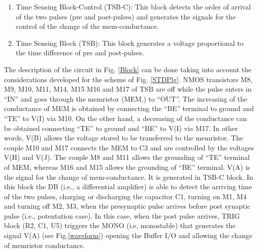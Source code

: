 \documentclass[review]{elsarticle}
\begin{document}
\begin{enumerate}
\item Time Sensing Block-Control (TSB-C): This block detects the order of arrival of the two pulses (pre and post-pulses) and generates the signals for the control of the change of the mem-conductance. 
\item Time Sensing Block (TSB): This block generates a voltage proportional to the time difference of pre and post-pulses. 
\end{enumerate}



The description of the circuit in Fig. \ref{Block} can be done taking into account the considerations developed for the scheme of Fig. \ref{STDPlg}.
NMOS transistors  M8, M9, M10, M11, M14, M15 M16 and M17 of TSB are off while the pulse enters in ``IN'' and goes through the memristor (MEM,) to ``OUT''. The increasing of the conductance of MEM is obtained by connecting the ``BE'' terminal to ground and ``TE'' to V(I) via M10. On the other hand, a decreasing of the conductance can be obtained connecting ``TE'' to ground and ``BE'' to V(I) via M17. In other words, V(B) allows the voltage stored to be transferred to the memristor.  The couple M10 and M17 connects the MEM to C3 and are controlled by the voltages V(H) and V(J). The couple M8 and M11 allows the grounding of ``TE'' terminal of MEM, whereas M16 and M15 allows the grounding of ``BE'' terminal.  V(A) is the signal for the change of mem-conductance. It is generated in TSB-C block. In this block the DB (i.e., a differential amplifier) is able to detect the arriving time of the two pulses, charging or discharging the capacitor C1, turning on M1, M4 and turning off M2, M3, when the presynaptic pulse arrives before post synaptic pulse (i.e., potentation case). In this case, when the  post pulse arrives, TRIG block (R2, C1, U5) triggers the MONO (i.e, monostable) that generates the signal V(A) (see Fig.\ref{waveform}) opening the Buffer I/O and allowing the change of memristor conductance.
\end{document}
